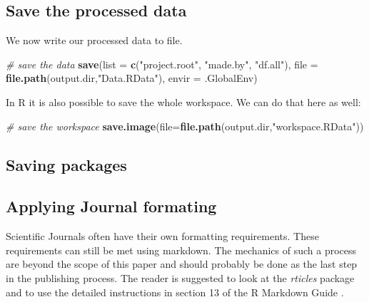 \documentclass[11pt,]{article}
\newenvironment{Shaded}{\begin{snugshade}}{\end{snugshade}}
\newcommand{\CommentTok}[1]{\textcolor[rgb]{0.56,0.35,0.01}{\textit{#1}}}
\newcommand{\DataTypeTok}[1]{\textcolor[rgb]{0.13,0.29,0.53}{#1}}
\newcommand{\KeywordTok}[1]{\textcolor[rgb]{0.13,0.29,0.53}{\textbf{#1}}}
\newcommand{\NormalTok}[1]{#1}
\newcommand{\StringTok}[1]{\textcolor[rgb]{0.31,0.60,0.02}{#1}}
\begin{document}
\hypertarget{save-the-processed-data}{%
\subsection{Save the processed data}\label{save-the-processed-data}}

We now write our processed data to file.

\begin{Shaded}
\begin{Highlighting}[]
\CommentTok{# save the data}
\KeywordTok{save}\NormalTok{(}\DataTypeTok{list =} \KeywordTok{c}\NormalTok{(}\StringTok{"project.root"}\NormalTok{,}
              \StringTok{"made.by"}\NormalTok{,}
              \StringTok{"df.all"}\NormalTok{),}
       \DataTypeTok{file =} \KeywordTok{file.path}\NormalTok{(output.dir,}\StringTok{"Data.RData"}\NormalTok{),}
       \DataTypeTok{envir =}\NormalTok{ .GlobalEnv)}
\end{Highlighting}
\end{Shaded}

In R it is also possible to save the whole workspace. We can do that here as well:

\begin{Shaded}
\begin{Highlighting}[]
\CommentTok{# save the workspace}
\KeywordTok{save.image}\NormalTok{(}\DataTypeTok{file=}\KeywordTok{file.path}\NormalTok{(output.dir,}\StringTok{"workspace.RData"}\NormalTok{))}
\end{Highlighting}
\end{Shaded}

\hypertarget{saving-packages}{%
\subsection{Saving packages}\label{saving-packages}}

\hypertarget{applying-journal-formating}{%
\subsection{Applying Journal formating}\label{applying-journal-formating}}

Scientific Journals often have their own formatting requirements. These requirements can still be met using markdown. The mechanics of such a process are beyond the scope of this paper and should probably be done as the last step in the publishing process. The reader is suggested to look at the \emph{rticles} package and to use the detailed instructions in section 13 of the R Markdown Guide \citep{R-Markdown-Guide}.
\end{document}

